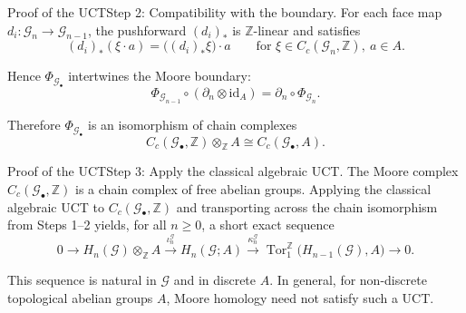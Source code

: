 \documentclass[aspectratio=169]{beamer}
\renewcommand{\ldots}{
  \mathinner{{\ldotp}{\ldotp}}
}
\newcommand{\G}{\mathcal{G}}
\newcommand{\ZZ}{\mathbb{Z}}
\newcommand{\supp}{\operatorname{supp}}
\begin{document}

\begin{frame}{Proof of the UCT}{Step 2: Compatibility with the boundary.}
For each face map \(d_i\colon \G_n\to \G_{n-1}\), the pushforward \((d_i)_*\) is \(\ZZ\)-linear and satisfies
\[
(d_i)_*(\xi\cdot a)=\bigl((d_i)_*\xi\bigr)\cdot a
\qquad
\text{for } \xi\in C_c(\G_n,\ZZ),\ a\in A.
\]
\pause

Hence \(\Phi_{\G_\bullet}\) intertwines the Moore boundary:
\[
\Phi_{\G_{n-1}}\circ(\partial_n\otimes \mathrm{id}_A)=\partial_n\circ \Phi_{\G_n}.
\]
\pause

Therefore \(\Phi_{\G_\bullet}\) is an isomorphism of chain complexes
\[
C_c(\G_\bullet,\ZZ)\otimes_{\ZZ} A \cong C_c(\G_\bullet,A).
\]
\end{frame}

\begin{frame}{Proof of the UCT}{Step 3: Apply the classical algebraic UCT.}
The Moore complex \(C_c(\G_\bullet,\ZZ)\) is a chain complex of free abelian groups.
Applying the classical algebraic UCT to \(C_c(\G_\bullet,\ZZ)\) and transporting across the chain isomorphism from Steps 1--2 yields, for all \(n\ge 0\), a short exact sequence
\[
0
\to H_n(\G)\otimes_{\ZZ} A
\xrightarrow{\iota_n^{\G}}
H_n(\G;A)
\xrightarrow{\kappa_n^{\G}}
\operatorname{Tor}_1^{\ZZ}\bigl(H_{n-1}(\G),A\bigr)
\to 0.
\]
\pause

This sequence is natural in \(\G\) and in discrete \(A\).
In general, for non-discrete topological abelian groups \(A\), Moore homology need not satisfy such a UCT.
\end{frame}
\end{document}
